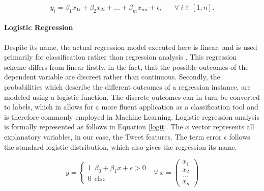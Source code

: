 	\begin{equation}
		y_i = \beta_1 x_{1i}+ \beta_2 x_{2i} + ... + \beta_m x_{mi} + \epsilon_i \ \ \ \ \ \ \ \ 
		\forall \ i \in [1,n].
		\label{lin_reg}
	\end{equation}
	
	\paragraph{Logistic Regression} Despite its name, the actual regression model executed here is linear, and is used primarily for classification rather than regression analysis \cite{bishop2006logistic}. This regression scheme differs from linear firstly, in the fact, that the possible outcomes of the dependent variable are discreet rather than continuous. Secondly, the probabilities which describe the different outcomes of a regression instance, are modeled using a logistic function. The discrete outcomes can in turn be converted to labels, which in allows for a more fluent application as a classification tool and is therefore commonly employed in  Machine Learning. Logistic regression analysis is formally represented as follows in Equation \ref{logit}. The $x$ vector represents all explanatory variables, in our case, the Tweet features. The term error $\epsilon$ follows the standard logistic distribution, which also gives the regression its name. 
	
	\begin{equation}
		y = 
		\begin{cases}
		1 \ \  \beta_0 + \beta_1 x + \epsilon > 0 \\
		0 \ \  \text{else } 
		\end{cases} \text{         } \forall \  x = 
		\begin{pmatrix}x_1\\x_2\\...\\x_n \end{pmatrix}
		\label{logit}
	\end{equation}
